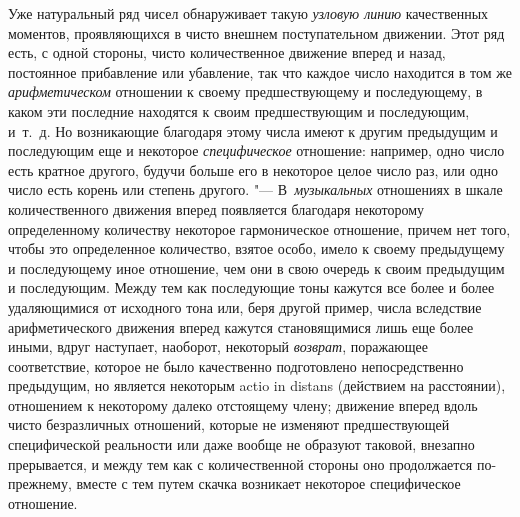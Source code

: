 Уже натуральный ряд чисел обнаруживает такую
{\em узловую линию} качественных моментов,
проявляющихся в чисто внешнем поступательном движении. Этот ряд есть, с
одной стороны, чисто количественное движение вперед и назад, постоянное
прибавление или убавление, так что каждое число находится в том же
{\em арифметическом} отношении к своему предшествующему
и последующему, в каком эти последние находятся к своим предшествующим и
последующим, и~т.~д. Но возникающие благодаря этому числа имеют к другим
предыдущим и последующим еще и некоторое
{\em специфическое} отношение: например, одно число
есть кратное другого, будучи больше его в некоторое целое число раз, или
одно число есть корень или степень другого. "--- В~{\em музыкальных}
отношениях в шкале количественного
движения вперед появляется благодаря некоторому определенному количеству
некоторое гармоническое отношение, причем нет того, чтобы это определенное
количество, взятое особо, имело к своему предыдущему и последующему иное
отношение, чем они в свою очередь к своим предыдущим и последующим. Между
тем как последующие тоны кажутся все более и более удаляющимися от
исходного тона или, беря другой пример, числа вследствие арифметического
движения вперед кажутся становящимися лишь еще более иными, вдруг
наступает, наоборот, некоторый {\em возврат},
поражающее соответствие, которое не было качественно подготовлено
непосредственно предыдущим, но является некоторым actio in distans
(действием на расстоянии), отношением к некоторому далеко отстоящему члену;
движение вперед вдоль чисто безразличных отношений, которые не изменяют
предшествующей специфической реальности или даже вообще не образуют
таковой, внезапно прерывается, и между тем как с количественной стороны оно
продолжается по-прежнему, вместе с тем путем скачка возникает некоторое
специфическое отношение.

